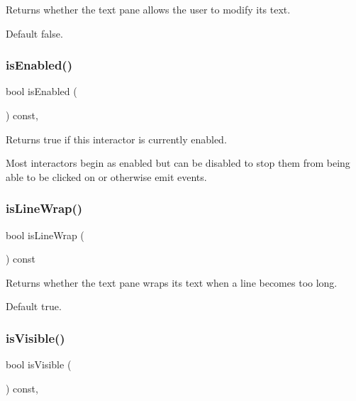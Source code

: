 Returns whether the text pane allows the user to modify its text. 

Default false. \mbox{\label{classGInteractor_aacb819fb241851fd9fc045271baa4034}} 
\subsubsection{\texorpdfstring{is\+Enabled()}{isEnabled()}}
{\footnotesize\ttfamily bool is\+Enabled (\begin{DoxyParamCaption}{ }\end{DoxyParamCaption}) const\hspace{0.3cm}{\ttfamily [virtual]}, {\ttfamily [inherited]}}



Returns true if this interactor is currently enabled. 

Most interactors begin as enabled but can be disabled to stop them from being able to be clicked on or otherwise emit events. \mbox{\label{classGBrowserPane_ae09e72290b6e8a23bcc77752da6dffa5}} 
\subsubsection{\texorpdfstring{is\+Line\+Wrap()}{isLineWrap()}}
{\footnotesize\ttfamily bool is\+Line\+Wrap (\begin{DoxyParamCaption}{ }\end{DoxyParamCaption}) const\hspace{0.3cm}{\ttfamily [virtual]}}



Returns whether the text pane wraps its text when a line becomes too long. 

Default true. \mbox{\label{classGInteractor_a9d8a6cfb13917785c143e74d40e4e2be}} 
\subsubsection{\texorpdfstring{is\+Visible()}{isVisible()}}
{\footnotesize\ttfamily bool is\+Visible (\begin{DoxyParamCaption}{ }\end{DoxyParamCaption}) const\hspace{0.3cm}{\ttfamily [virtual]}, {\ttfamily [inherited]}}



